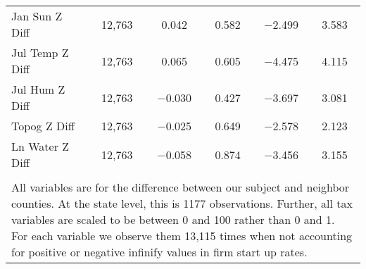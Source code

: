 \begin{table}[!htbp]
\begin{tabular}{@{\extracolsep{5pt}}lccccc}
Jan Sun Z Diff & 12,763 & 0.042 & 0.582 & $-$2.499 & 3.583 \\ 
Jul Temp Z Diff & 12,763 & 0.065 & 0.605 & $-$4.475 & 4.115 \\ 
Jul Hum Z Diff & 12,763 & $-$0.030 & 0.427 & $-$3.697 & 3.081 \\ 
Topog Z Diff & 12,763 & $-$0.025 & 0.649 & $-$2.578 & 2.123 \\ 
Ln Water Z Diff & 12,763 & $-$0.058 & 0.874 & $-$3.456 & 3.155 \\ 
\hline \\[-1.8ex] 
\multicolumn{6}{l}{All variables are for the difference between our subject and neighbor counties. At the state level, this is 1177 observations. Further, all tax variables are scaled to be between 0 and 100 rather than 0 and 1. For each variable we observe them 13,115 times when not accounting for positive or negative infinify values in firm start up rates.} \\ 
\end{tabular} 
\end{table} 
